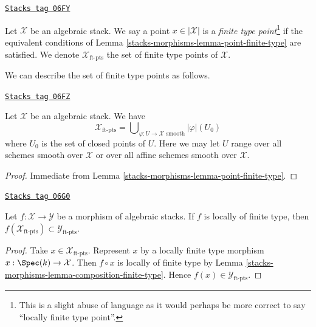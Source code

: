 \begin{definition}
\label{stacks-morphisms-definition-finite-type-point}
\href{https://stacks.math.columbia.edu/tag/06FY}{\texttt{Stacks tag 06FY}}

Let $\mathcal{X}$ be an algebraic stack. We say a point $x \in |\mathcal{X}|$
is a {\it finite type point}\footnote{This is a
slight abuse of language as it would perhaps be more correct to say
``locally finite type point''.} if the equivalent conditions of
Lemma \ref{stacks-morphisms-lemma-point-finite-type}
are satisfied. We denote $\mathcal{X}_{\text{ft-pts}}$
the set of finite type points of $\mathcal{X}$.
\end{definition}

We can describe the set of finite type points as follows.

\begin{lemma}
\label{stacks-morphisms-lemma-identify-finite-type-points}
\href{https://stacks.math.columbia.edu/tag/06FZ}{\texttt{Stacks tag 06FZ}}

Let $\mathcal{X}$ be an algebraic stack. We have
$$
\mathcal{X}_{\text{ft-pts}} =
\bigcup\nolimits_{\varphi : U \to \mathcal{X}\text{ smooth}} |\varphi|(U_0)
$$
where $U_0$ is the set of closed points of $U$.
Here we may let $U$ range over all schemes smooth over $\mathcal{X}$
or over all affine schemes smooth over $\mathcal{X}$.
\end{lemma}

\begin{proof}
Immediate from
Lemma \ref{stacks-morphisms-lemma-point-finite-type}.
\end{proof}

\begin{lemma}
\label{stacks-morphisms-lemma-finite-type-points-morphism}
\href{https://stacks.math.columbia.edu/tag/06G0}{\texttt{Stacks tag 06G0}}

Let $f : \mathcal{X} \to \mathcal{Y}$ be a morphism of algebraic stacks.
If $f$ is locally of finite type, then
$f(\mathcal{X}_{\text{ft-pts}}) \subset \mathcal{Y}_{\text{ft-pts}}$.
\end{lemma}

\begin{proof}
Take $x \in \mathcal{X}_{\text{ft-pts}}$. Represent $x$ by a locally
finite type morphism $x : \Spec(k) \to \mathcal{X}$. Then
$f \circ x$ is locally of finite type by
Lemma \ref{stacks-morphisms-lemma-composition-finite-type}.
Hence $f(x) \in \mathcal{Y}_{\text{ft-pts}}$.
\end{proof}

